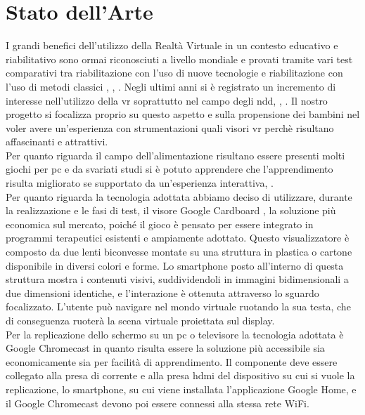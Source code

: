 \section{Stato dell'Arte} \label{sec:stato}
I grandi benefici dell'utilizzo della Realtà Virtuale in un contesto educativo e riabilitativo sono ormai riconosciuti a livello mondiale e provati tramite vari test comparativi tra riabilitazione con l'uso di nuove tecnologie e riabilitazione con l'uso di metodi classici \cite{rif3}, \cite{rif4}, \cite{rif5}. Negli ultimi anni si è registrato un incremento di interesse nell'utilizzo della \acs{vr} soprattutto nel campo degli \acs{ndd}, \cite{rif6}, \cite{rif7}. Il nostro progetto si focalizza proprio su questo aspetto e sulla propensione dei bambini nel voler avere un'esperienza con strumentazioni quali visori \acs{vr} perchè risultano affascinanti e attrattivi.\\
Per quanto riguarda il campo dell'alimentazione risultano essere presenti molti giochi per pc e da svariati studi si è potuto apprendere che l'apprendimento risulta migliorato se supportato da un'esperienza interattiva, \cite{rif8}.\\
Per quanto riguarda la tecnologia adottata abbiamo deciso di utilizzare, durante la realizzazione e le fasi di test, il visore Google Cardboard \cite{rif9}, la soluzione più economica sul mercato, poiché il gioco è pensato per essere integrato in programmi terapeutici esistenti e ampiamente adottato. Questo visualizzatore è composto da due lenti biconvesse montate su una struttura in plastica o cartone disponibile in diversi colori e forme. Lo smartphone posto all'interno di questa struttura mostra i contenuti visivi, suddividendoli in immagini bidimensionali a due dimensioni identiche, e l'interazione è ottenuta attraverso lo sguardo focalizzato. L'utente può navigare nel mondo virtuale ruotando la sua testa, che di conseguenza ruoterà la scena virtuale proiettata sul display.\\
Per la replicazione dello schermo su un pc o televisore la tecnologia adottata è Google Chromecast \cite{rif10} in quanto risulta essere la soluzione più accessibile sia economicamente sia per facilità di apprendimento. Il componente deve essere collegato alla presa di corrente e alla presa \acs{hdmi} del dispositivo su cui si vuole la replicazione, lo smartphone, su cui viene installata l'applicazione Google Home, e il Google Chromecast devono poi essere connessi alla stessa rete WiFi.